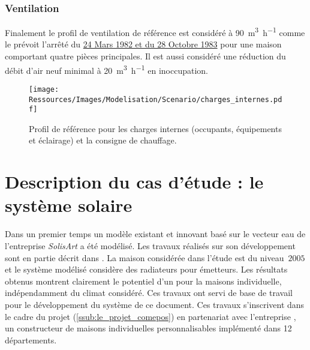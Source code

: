 \subsubsection{Ventilation} %
\label{ssub:ventilation_ref}
Finalement le profil de ventilation de référence est considéré à \SI[per-mode=symbol]{90}{\meter\cubed\per\hour}
comme le prévoit l’arrêté du \href{https://www.legifrance.gouv.fr/affichTexte.do?cidTexte=JORFTEXT000000862344}{24 Mars
1982 et du 28 Octobre 1983} pour une maison comportant quatre pièces principales. Il est aussi
considéré une réduction du débit d’air neuf minimal à \SI[per-mode=symbol]{20}{\meter\cubed\per\hour}
en inoccupation.

\begin{figure}
    \centering
    \texttt{[image: Ressources/Images/Modelisation/Scenario/charges\_internes.pdf]}
    \caption{Profil de référence pour les charges internes (occupants, équipements et éclairage)
             et la consigne de chauffage.}
    \label{fig:scenario_reference}
\end{figure}




\section{Description du cas d’étude : le système solaire} %
\label{sec:description_du_cas_d_etude_le_systeme_solaire}
Dans un premier temps un modèle existant et innovant basé sur le vecteur eau
de l’entreprise \textit{SolisArt} a été modélisé. Les travaux réalisés sur son
développement sont en partie décrit dans \textcite{Bois2015}. La maison considérée dans
l’étude est du niveau \,$2005$ et le système modélisé considère des radiateurs
pour émetteurs. Les résultats obtenus montrent clairement le potentiel d’un 
pour la maisons individuelle, indépendamment du climat considéré. Ces travaux
ont servi de base de travail pour le développement du système de ce document.
Ces travaux s’inscrivent dans le cadre du projet  (\ref{ssub:le_projet_comepos})
en partenariat avec l’entreprise , un constructeur de maisons individuelles
personnalisables implémenté dans \num{12} départements.

